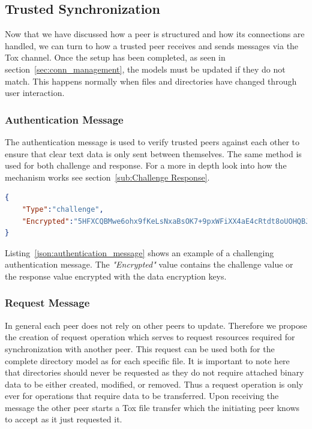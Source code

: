 \subsection{Trusted Synchronization}
\label{sub:Trusted Synchronization}

Now that we have discussed how a peer is structured and how its connections are handled, we can turn to how a trusted peer receives and sends messages via the Tox channel.
Once the setup has been completed, as seen in section~\ref{sec:conn_management}, the models must be updated if they do not match.
This happens normally when files and directories have changed through user interaction.

\subsubsection{Authentication Message}
\label{subs:Authentication Message}

The authentication message is used to verify trusted peers against each other to ensure that clear text data is only sent between themselves.
The same method is used for both challenge and response.
For a more in depth look into how the mechanism works see section~\ref{sub:Challenge Response}.

\begin{listing}[htp]
    \begin{lstlisting}[language=json,firstnumber=0]
{
    "Type":"challenge",
    "Encrypted":"5HFXCQBMwe6ohx9fKeLsNxaBsOK7+9pxWFiXX4aE4cRtdt8oUOHQBJ6XrowiwwgLunM="
}
    \end{lstlisting}
\caption[Authentication Message]{An example of a valid authentication message containing a challenge.}
\label{json:authentication_message}
\end{listing}

Listing~\ref{json:authentication_message} shows an example of a challenging authentication message.
The \textit{"Encrypted"} value contains the challenge value or the response value encrypted with the data encryption keys.

\subsubsection{Request Message}
\label{subs:Request Message}

In general each peer does not rely on other peers to update.
Therefore we propose the creation of request operation which serves to request resources required for synchronization with another peer.
This request can be used both for the complete directory model as for each specific file.
It is important to note here that directories should never be requested as they do not require attached binary data to be either created, modified, or removed.
Thus a request operation is only ever for operations that require data to be transferred.
Upon receiving the message the other peer starts a Tox file transfer which the initiating peer knows to accept as it just requested it.

